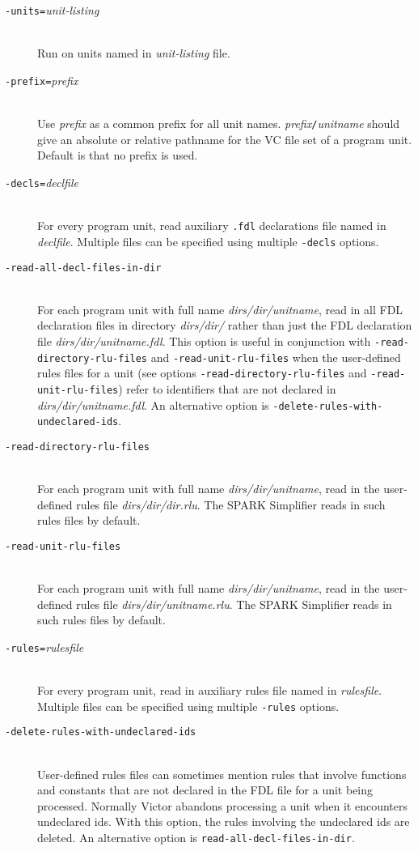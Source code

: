 \documentclass[12pt,fleqn]{article}
\newcommand{\optionb}[1]{\item[\texttt{-{#1}}]\ \\}
\newcommand{\optionv}[2]{\item[\texttt{-{#1}=}\mdseries\textit{#2}]\ \\}
\begin{document}
\begin{description}

  \optionv{units}{unit-listing}  Run on units named in \textit{unit-listing}
   file.

  \optionv{prefix}{prefix} 
    Use \textit{prefix} as a common prefix for all unit names.  
    \textit{prefix}\texttt{/}\textit{unitname} should give an absolute or
    relative pathname for the VC file set of a program unit.  Default is
    that no prefix is used.
   
  \optionv{decls}{declfile}
    For every program unit, read auxiliary \texttt{.fdl} 
    declarations file named in \textit{declfile}.  
    Multiple files can be specified using multiple 
    \texttt{-decls} options.

  \optionb{read-all-decl-files-in-dir}
  For each program unit with full name \textit{dirs/dir/unitname},
  read in all FDL declaration files in directory \textit{dirs/dir/} rather
  than just the FDL declaration file \textit{dirs/dir/unitname.fdl}.
  This option is useful in conjunction with 
  \texttt{-read-directory-rlu-files}
  and \texttt{-read-unit-rlu-files} when the user-defined rules files for a
  unit 
  (see options \texttt{-read-directory-rlu-files} 
   and \texttt{-read-unit-rlu-files})
  refer to identifiers that are not declared in \textit{dirs/dir/unitname.fdl}.
  An alternative option is \texttt{-delete-rules-with-undeclared-ids}.

  \optionb{read-directory-rlu-files}
  For each program unit with full name \textit{dirs/dir/unitname},
  read in the user-defined rules file \textit{dirs/dir/dir.rlu}.  The SPARK
  Simplifier reads in such rules files by default.

  \optionb{read-unit-rlu-files}
  For each program unit with full name \textit{dirs/dir/unitname},
  read in the user-defined rules file \textit{dirs/dir/unitname.rlu}.  
  The SPARK Simplifier reads in such rules files by default.

  \optionv{rules}{rulesfile} For every program unit, read in
    auxiliary rules file named in \textit{rulesfile}.  Multiple files
    can be specified using multiple \texttt{-rules} options.

  \optionb{delete-rules-with-undeclared-ids}
  User-defined rules files can sometimes mention rules that involve 
  functions and constants that are not declared in the FDL file for a unit
  being processed.   Normally Victor abandons processing a unit when
  it encounters undeclared ids.  With this option, the rules involving 
  the undeclared ids are deleted.
  An alternative option is \texttt{read-all-decl-files-in-dir}.


\end{description}
\end{document}
